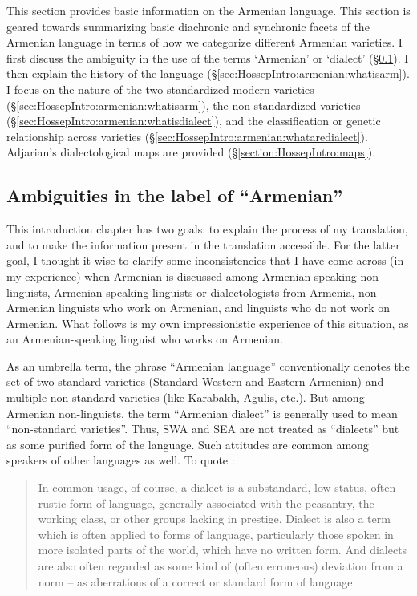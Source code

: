 \documentclass[output=paper]{langscibook}
\begin{document}
This section provides basic information on the Armenian language. This section is geared towards summarizing basic diachronic and synchronic facets of the Armenian language in terms of how we categorize different Armenian varieties. I first discuss the ambiguity in the use of the terms `Armenian' or `dialect' (\S\ref{sec:HossepIntro:armenian:ambiguity}). I then explain the history of the language (\S\ref{sec:HossepIntro:armenian:whatisarm}). I   focus on the nature of the two standardized modern varieties  (\S\ref{sec:HossepIntro:armenian:whatisarm}), the non\hyp standardized varieties (\S\ref{sec:HossepIntro:armenian:whatisdialect}), and the classification or genetic relationship across   varieties (\S\ref{sec:HossepIntro:armenian:whataredialect}). Adjarian's dialectological maps are provided   (\S\ref{section:HossepIntro:maps}).  

\subsection{Ambiguities in the label of ``Armenian''}\label{sec:HossepIntro:armenian:ambiguity}



This introduction chapter has two goals: to explain the process of my translation, and to make the information present in the translation  accessible. For the latter goal, I thought it wise to clarify some inconsistencies that I have come across (in my experience) when Armenian is discussed among Armenian\hyp speaking non-linguists, Armenian\hyp speaking linguists or dialectologists from Armenia, non\hyp Armenian linguists who work on Armenian, and linguists who do not work on Armenian. What follows is my own impressionistic experience of this situation, as an Armenian\hyp speaking linguist who works on Armenian.

As an umbrella term, the phrase “Armenian language” conventionally denotes the set of two standard varieties (Standard Western and Eastern Armenian) and multiple non-standard varieties (like Karabakh, Agulis, etc.). But among Armenian non-linguists, the term ``Armenian dialect'' is generally used to mean ``non-standard varieties''.  Thus, SWA and SEA are not treated as ``dialects'' but as some purified form of the language. Such attitudes are common among speakers of other languages as well. To quote \citet[3]{ChambersTrudgill-1998-Dialectology}:


\begin{quote}
	In common usage, of course, a dialect is a substandard, low-status, often rustic form of language, generally associated with the peasantry, the working class, or other groups lacking in prestige. Dialect is also a term which is often applied to forms of language, particularly those spoken in more isolated parts of the world, which have no written form. And dialects are also often regarded as some kind of (often erroneous) deviation from a norm – as aberrations of a correct or standard form of language.
\end{quote}
\end{document}
